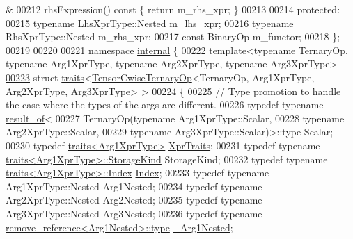 \begin{DoxyCode}
      &
00212     rhsExpression()\textcolor{keyword}{ const }\{ \textcolor{keywordflow}{return} m\_rhs\_xpr; \}
00213 
00214   \textcolor{keyword}{protected}:
00215     \textcolor{keyword}{typename} LhsXprType::Nested m\_lhs\_xpr;
00216     \textcolor{keyword}{typename} RhsXprType::Nested m\_rhs\_xpr;
00217     \textcolor{keyword}{const} BinaryOp m\_functor;
00218 \};
00219 
00220 
00221 \textcolor{keyword}{namespace }\hyperlink{namespaceinternal}{internal} \{
00222 \textcolor{keyword}{template}<\textcolor{keyword}{typename} TernaryOp, \textcolor{keyword}{typename} Arg1XprType, \textcolor{keyword}{typename} Arg2XprType, \textcolor{keyword}{typename} Arg3XprType>
\hyperlink{struct_eigen_1_1internal_1_1traits_3_01_tensor_cwise_ternary_op_3_01_ternary_op_00_01_arg1_xpr_tfaef9778449e83c93f69e5312efba568}{00223} \textcolor{keyword}{struct }\hyperlink{struct_eigen_1_1internal_1_1traits}{traits}<\hyperlink{class_eigen_1_1_tensor_cwise_ternary_op}{TensorCwiseTernaryOp}<TernaryOp, Arg1XprType, Arg2XprType, 
      Arg3XprType> >
00224 \{
00225   \textcolor{comment}{// Type promotion to handle the case where the types of the args are different.}
00226   \textcolor{keyword}{typedef} \textcolor{keyword}{typename} \hyperlink{struct_eigen_1_1internal_1_1result__of}{result\_of}<
00227       TernaryOp(\textcolor{keyword}{typename} Arg1XprType::Scalar,
00228                 \textcolor{keyword}{typename} Arg2XprType::Scalar,
00229                 \textcolor{keyword}{typename} Arg3XprType::Scalar)>::type Scalar;
00230   \textcolor{keyword}{typedef} \hyperlink{struct_eigen_1_1internal_1_1traits}{traits<Arg1XprType>} \hyperlink{struct_eigen_1_1internal_1_1traits}{XprTraits};
00231   \textcolor{keyword}{typedef} \textcolor{keyword}{typename} \hyperlink{struct_eigen_1_1internal_1_1traits}{traits<Arg1XprType>::StorageKind} StorageKind;
00232   \textcolor{keyword}{typedef} \textcolor{keyword}{typename} \hyperlink{struct_eigen_1_1internal_1_1traits}{traits<Arg1XprType>::Index} \hyperlink{namespace_eigen_a62e77e0933482dafde8fe197d9a2cfde}{Index};
00233   \textcolor{keyword}{typedef} \textcolor{keyword}{typename} Arg1XprType::Nested Arg1Nested;
00234   \textcolor{keyword}{typedef} \textcolor{keyword}{typename} Arg2XprType::Nested Arg2Nested;
00235   \textcolor{keyword}{typedef} \textcolor{keyword}{typename} Arg3XprType::Nested Arg3Nested;
00236   \textcolor{keyword}{typedef} \textcolor{keyword}{typename} \hyperlink{group___sparse_core___module}{remove\_reference<Arg1Nested>::type} 
      \hyperlink{group___sparse_core___module}{\_Arg1Nested};

\end{DoxyCode}
